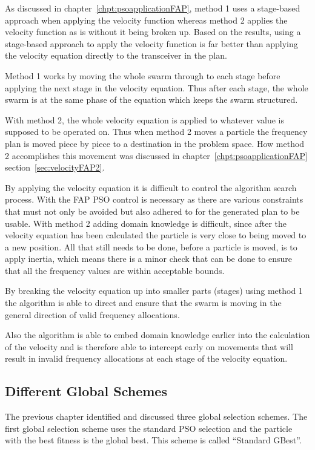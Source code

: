 As discussed in chapter~\ref{chpt:psoapplicationFAP}, method 1 uses a stage-based approach when applying the velocity function whereas method 2 applies the velocity function as is without it being broken up. Based on the results, using a stage-based approach to apply the velocity function is far better than applying the velocity equation directly to the transceiver in the plan.

Method 1 works by moving the whole swarm through to each stage before applying the next stage in the velocity equation. Thus after each stage, the whole swarm is at the same phase of the equation which keeps the swarm structured.

With method 2, the whole velocity equation is applied to whatever value is supposed to be operated on. Thus when method 2 moves a particle the frequency plan is moved piece by piece to a destination in the problem space. How method 2 accomplishes this movement was discussed in chapter~\ref{chpt:psoapplicationFAP} section~\ref{sec:velocityFAP2}.

By applying the velocity equation it is difficult to control the algorithm search process. With the FAP PSO control is necessary as there are various constraints that must not only be avoided but also adhered to for the generated plan to be usable. With method 2 adding domain knowledge is difficult, since after the velocity equation has been calculated the particle is very close to being moved to a new position. All that still needs to be done, before a particle is moved, is to apply inertia, which means there is a minor check that can be done to ensure that all the frequency values are within acceptable bounds.

By breaking the velocity equation up into smaller parts (stages) using method 1 the algorithm is able to direct and ensure that the swarm is moving in the general direction of valid frequency allocations.

Also the algorithm is able to embed domain knowledge earlier into the calculation of the velocity and is therefore able to intercept early on movements that will result in invalid frequency allocations at each stage of the velocity equation.

\subsection{Different Global Schemes}
\label{sec:diffglobalschemes}
The previous chapter identified and discussed three global selection schemes. The first global selection scheme uses the standard PSO selection and the particle with the best fitness is the global best. This scheme is called ``Standard GBest''.

